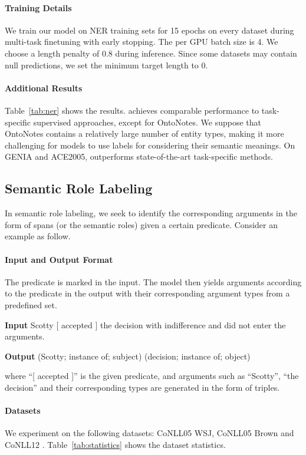 \paragraph{Training Details} 
We train our model on NER training sets for 15 epochs on every dataset during multi-task finetuning with early stopping. The per GPU batch size is 4. We choose a length penalty of 0.8 during inference. Since some datasets may contain null predictions, we set the minimum target length to 0. 

\paragraph{Additional Results}
Table~\ref{tab:ner} shows the results. \method achieves comparable performance to task-specific supervised approaches, except for OntoNotes. We suppose that OntoNotes contains a relatively large number of entity types, making it more challenging for models to use labels for considering their semantic meanings. On GENIA and ACE2005, \method outperforms state-of-the-art task-specific methods.

\subsection{Semantic Role Labeling}
In semantic role labeling, we seek to identify the corresponding arguments in the form of spans (or the semantic roles) given a certain predicate. Consider an example as follow.

\paragraph{Input and Output Format}
The predicate is marked in the input. The model then yields arguments according to the predicate in the output with their corresponding argument types from a predefined set.
\begin{enumerate*}
    \item[] {\bf Input} Scotty [ accepted ] the decision with indifference and did not enter the arguments.
    \item[] {\bf Output} (Scotty; instance of; subject) (decision; instance of; object)
\end{enumerate*}

\noindent where ``[ accepted ]'' is the given predicate, and arguments such as ``Scotty'', ``the decision'' and their corresponding types are generated in the form of triples.

\paragraph{Datasets}
We experiment on the following datasets: CoNLL05 WSJ, CoNLL05 Brown \citep{carreras-marquez-2005-introduction} and CoNLL12 \citep{pradhan-etal-2013-towards}. Table~\ref{tab:statistics} shows the dataset statistics.

